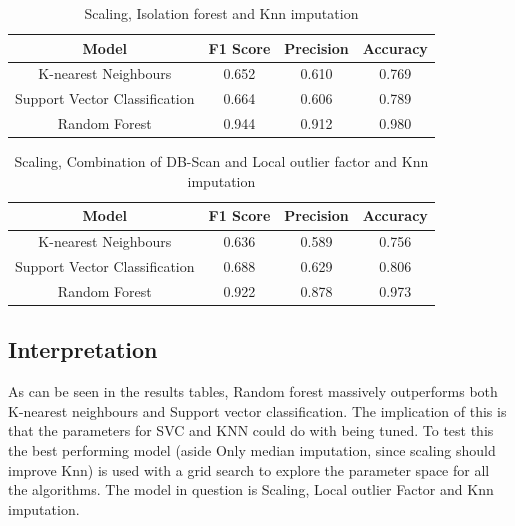 \documentclass[a4paper]{article}
\begin{document}

\begin{table}[H]
    \centering
    \begin{tabular}{|c|c|c|c|}
    \hline
         Model & F1 Score  & Precision  & Accuracy  \\
    \hline
         K-nearest Neighbours & 0.652 & 0.610 & 0.769 \\
    \hline
         Support Vector Classification & 0.664 & 0.606 & 0.789 \\
    \hline
         Random Forest & 0.944 & 0.912 & 0.980 \\
    \hline
    \end{tabular}
    \caption{Scaling, Isolation forest and Knn imputation}
    \label{tab:my_label}
\end{table}


\begin{table}[H]
    \centering
    \begin{tabular}{|c|c|c|c|}
    \hline
         Model & F1 Score & Precision & Accuracy \\
    \hline
         K-nearest Neighbours & 0.636 & 0.589 & 0.756 \\
    \hline
         Support Vector Classification & 0.688 & 0.629 & 0.806 \\
    \hline
         Random Forest & 0.922 & 0.878 & 0.973 \\
    \hline
    \end{tabular}
    \caption{Scaling, Combination of DB-Scan and Local outlier factor and Knn imputation}
    \label{tab:my_label}
\end{table}


\subsection{Interpretation}

As can be seen in the results tables, Random forest massively outperforms both K-nearest neighbours and Support vector classification. The implication of this is that the parameters for SVC and KNN could do with being tuned. To test this the best performing model (aside Only median imputation, since scaling should improve Knn) is used with a grid search to explore the parameter space for all the algorithms. The model in question is Scaling, Local outlier Factor and Knn imputation. 
\end{document}
